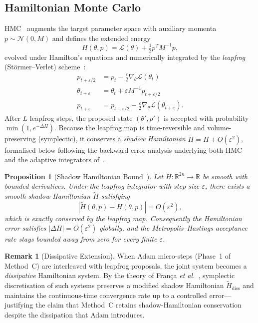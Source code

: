 \documentclass[11pt]{article}
\newtheorem{proposition}[theorem]{Proposition}
\theoremstyle{definition}
\newtheorem{remark}[theorem]{Remark}
\newcommand{\tHH}{\widetilde{H}}
\begin{document}
\subsection{Hamiltonian Monte Carlo}

HMC~\cite{duane1987,neal2011} augments the target parameter space
with auxiliary momenta $p\sim\mathcal{N}(0,M)$ and defines the
extended energy
\begin{equation}
H(\theta,p) = \mathcal{L}(\theta) + \tfrac{1}{2}p^TM^{-1}p,
\label{eq:hmc}
\end{equation}
evolved under Hamilton's equations and numerically integrated by the
\emph{leapfrog} (St\"ormer--Verlet) scheme~\cite{leimkuhler2004}:
\begin{align}
p_{t+\varepsilon/2} &= p_t - \tfrac{\varepsilon}{2}\nabla_\theta\mathcal{L}(\theta_t)
\label{eq:lf1}\\
\theta_{t+\varepsilon} &= \theta_t + \varepsilon M^{-1}p_{t+\varepsilon/2}
\label{eq:lf2}\\
p_{t+\varepsilon}   &= p_{t+\varepsilon/2}
  - \tfrac{\varepsilon}{2}\nabla_\theta\mathcal{L}(\theta_{t+\varepsilon}).
\label{eq:lf3}
\end{align}
After $L$ leapfrog steps, the proposed state $(\theta',p')$ is
accepted with probability $\min(1,e^{-\Delta H})$. Because the
leapfrog map is time-reversible and volume-preserving (symplectic),
it conserves a \emph{shadow Hamiltonian}
$\tHH=H+O(\varepsilon^2)$, formalised below following the backward
error analysis underlying both HMC~\cite{neal2011} and the adaptive
integrators of~\cite{duruisseaux2021adaptive}.

\begin{proposition}[Shadow Hamiltonian Bound~{\cite[Thm.~IX.3.1]{hairer2006}}]
\label{prop:shadow}
Let $H:\mathbb{R}^{2n}\to\mathbb{R}$ be smooth with bounded
derivatives. Under the leapfrog integrator with step size
$\varepsilon$, there exists a smooth \emph{shadow Hamiltonian}
$\tHH$ satisfying
\[
  |\tHH(\theta,p) - H(\theta,p)| = O(\varepsilon^2),
\]
which is \emph{exactly} conserved by the leapfrog map. Consequently
the Hamiltonian error satisfies $|\Delta H|=O(\varepsilon^2)$
globally, and the Metropolis--Hastings acceptance rate stays bounded
away from zero for every finite $\varepsilon$.
\end{proposition}

\begin{remark}[Dissipative Extension]
\label{rem:dissipative}
When Adam micro-steps (Phase~1 of Method~C) are interleaved with
leapfrog proposals, the joint system becomes a \emph{dissipative}
Hamiltonian system. By the theory of Fran\c{c}a \emph{et
al.}~\cite{franca2021dissipative}, symplectic discretisation of such
systems preserves a modified shadow Hamiltonian $\tHH_{\mathrm{diss}}$
and maintains the continuous-time convergence rate up to a controlled
error---justifying the claim that Method~C retains shadow-Hamiltonian
conservation despite the dissipation that Adam introduces.
\end{remark}
\end{document}
